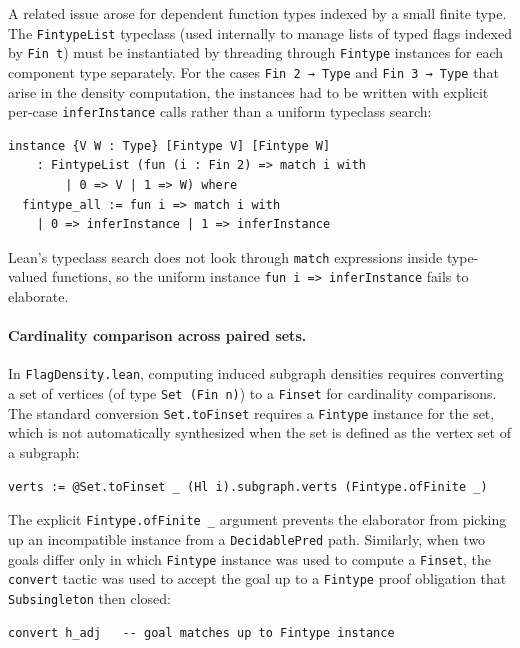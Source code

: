 \documentclass{article}
\newcommand{\lean}[1]{\texttt{#1}}
\begin{document}
A related issue arose for dependent function types indexed by a small finite
type.  The \lean{FintypeList} typeclass (used internally to manage lists of
typed flags indexed by \lean{Fin t}) must be instantiated by threading through
\lean{Fintype} instances for each component type separately.  For the cases
\lean{Fin 2 → Type} and \lean{Fin 3 → Type} that arise in the density
computation, the instances had to be written with explicit per-case
\lean{inferInstance} calls rather than a uniform typeclass search:
\begin{lstlisting}
instance {V W : Type} [Fintype V] [Fintype W]
    : FintypeList (fun (i : Fin 2) => match i with
        | 0 => V | 1 => W) where
  fintype_all := fun i => match i with
    | 0 => inferInstance | 1 => inferInstance
\end{lstlisting}
Lean's typeclass search does not look through \lean{match} expressions inside
type-valued functions, so the uniform instance \lean{fun i => inferInstance}
fails to elaborate.

\paragraph{Cardinality comparison across paired sets.}
In \lean{FlagDensity.lean}, computing induced subgraph densities requires
converting a set of vertices (of type \lean{Set (Fin n)}) to a \lean{Finset}
for cardinality comparisons.  The standard conversion
\lean{Set.toFinset} requires a \lean{Fintype} instance for the set, which is
not automatically synthesized when the set is defined as the vertex set of a
subgraph:
\begin{lstlisting}
verts := @Set.toFinset _ (Hl i).subgraph.verts (Fintype.ofFinite _)
\end{lstlisting}
The explicit \lean{Fintype.ofFinite \_} argument prevents the elaborator from
picking up an incompatible instance from a \lean{DecidablePred} path.
Similarly, when two goals differ only in which \lean{Fintype} instance was
used to compute a \lean{Finset}, the \lean{convert} tactic was used to accept
the goal up to a \lean{Fintype} proof obligation that \lean{Subsingleton}
then closed:
\begin{lstlisting}
convert h_adj   -- goal matches up to Fintype instance
\end{lstlisting}
\end{document}
